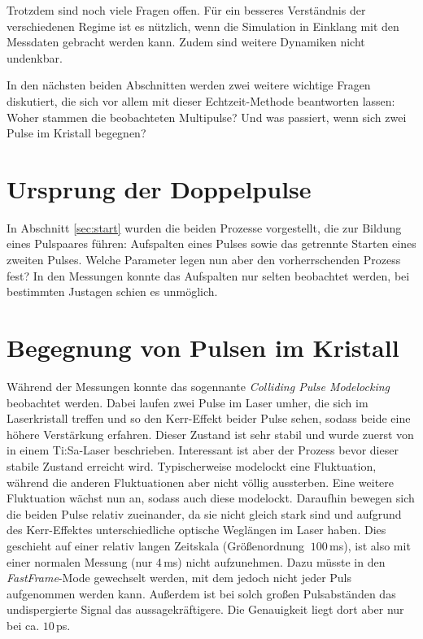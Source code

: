 \documentclass[bachelor,       %
               twoside,        %
               BCOR10mm,       %
               liststotoc,nomtotoc,bibtotoc, %
               english,ngerman, %
               final,          %
               ]{GAUBM}
\begin{document}
Trotzdem sind noch viele Fragen offen.
Für ein besseres Verständnis der verschiedenen Regime ist es nützlich, wenn die Simulation in Einklang mit den Messdaten gebracht werden kann.
Zudem sind weitere Dynamiken nicht undenkbar.

In den nächsten beiden Abschnitten werden zwei weitere wichtige Fragen diskutiert, die sich vor allem mit dieser Echtzeit-Methode beantworten lassen:
Woher stammen die beobachteten Multipulse? Und was passiert, wenn sich zwei Pulse im Kristall begegnen?

\section{Ursprung der Doppelpulse}
In Abschnitt \ref{sec:start} wurden die beiden Prozesse vorgestellt, die zur Bildung eines Pulspaares führen:
Aufspalten eines Pulses sowie das getrennte Starten eines zweiten Pulses.
Welche Parameter legen nun aber den vorherrschenden Prozess fest?
In den Messungen konnte das Aufspalten nur selten beobachtet werden, bei bestimmten Justagen schien es unmöglich.

\section{Begegnung von Pulsen im Kristall}
\label{sec:cpml}
Während der Messungen konnte das sogennante \textit{Colliding Pulse Modelocking} beobachtet werden.
Dabei laufen zwei Pulse im Laser umher, die sich im Laserkristall treffen und so den Kerr-Effekt beider Pulse sehen, sodass beide eine höhere Verstärkung erfahren.
Dieser Zustand ist sehr stabil und wurde zuerst von \cite{lai_multiple_1997} in einem Ti:Sa-Laser beschrieben.
Interessant ist aber der Prozess bevor dieser stabile Zustand erreicht wird.
Typischerweise modelockt eine Fluktuation, während die anderen Fluktuationen aber nicht völlig aussterben.
Eine weitere Fluktuation wächst nun an, sodass auch diese modelockt.
Daraufhin bewegen sich die beiden Pulse relativ zueinander, da sie nicht gleich stark sind und aufgrund des Kerr-Effektes unterschiedliche optische Weglängen im Laser haben.
Dies geschieht auf einer relativ langen Zeitskala (Größenordnung $~100\,$ms), ist also mit einer normalen Messung (nur 4\,ms) nicht aufzunehmen.
Dazu müsste in den \textit{FastFrame}-Mode gewechselt werden, mit dem jedoch nicht jeder Puls aufgenommen werden kann.
Außerdem ist bei solch großen Pulsabständen das undispergierte Signal das aussagekräftigere.
Die Genauigkeit liegt dort aber nur bei ca. $10\,$ps.
\end{document}
